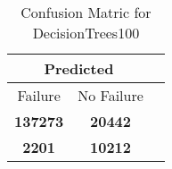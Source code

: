 \begin{table}[] 
\caption{Confusion Matric for DecisionTrees100} 
\label{Table: Prediction Accuracy-LOFDecisionTrees100100.0EKF-ignoreReflection-Reflection} 
\centering 
\begin{tabular} 
 {@{}ccc@{}} 
\toprule 
\multicolumn{2}{c}{\textbf{Predicted}}
 \\ \midrule 
\multicolumn{1}{|c|}{Failure} & 
\multicolumn{1}{c|}{No Failure}
 \\ \midrule 
\multicolumn{1}{|c|}{\color{green}\textbf{137273}} & 
\multicolumn{1}{c|}{\color{green}\textbf{20442}}
 \\ \midrule 
\multicolumn{1}{|c|}{\color{red}\textbf{2201}} & 
\multicolumn{1}{c|}{\color{red}\textbf{10212}}
 \\ \bottomrule 
\end{tabular} 
\end{table} 
